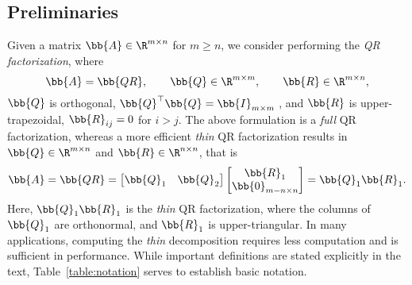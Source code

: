 \subsection{Preliminaries}
Given a matrix $\bb{A} \in \R^{m \times n}$ for $m\geq n$, we consider performing the {\it QR factorization}, 
where
$$\bb{A} = \bb{QR},
\qquad
\bb{Q} \in \R^{m \times m},
\qquad
\bb{R} \in \R^{m \times n},$$
$\bb{Q}$ is orthogonal, $\bb{Q}^\top \bb{Q} = \bb{I}_{m\times m}$ , and $\bb{R}$ is upper-trapezoidal, $\bb{R}_{ij} = 0$ for $i>j$.
The above formulation is a \emph{full} QR factorization, whereas a more efficient \emph{thin} QR factorization results in $\bb{Q}\in\R^{m\times n}$ and $\bb{R}\in\R^{n\times n}$, that is
\[
\bb{A} = \bb{QR} = \begin{bmatrix}\bb{Q}_1 & \bb{Q}_2\end{bmatrix} \begin{bmatrix}\bb{R}_1 \\ \bb{0}_{m-n \times n}\end{bmatrix} = \bb{Q}_1\bb{R}_1.
\]
Here, $\bb{Q}_1\bb{R}_1$ is the \emph{thin} QR factorization, where the columns of $\bb{Q}_1$ are orthonormal, and $\bb{R}_1$ is upper-triangular.
In many applications, computing the \emph{thin} decomposition requires less computation and is sufficient in performance. 
While important definitions are stated explicitly in the text, Table~\ref{table:notation} serves to establish basic notation.

